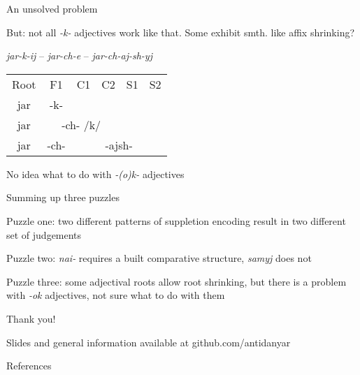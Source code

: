 \documentclass[xcolor=table]{beamer}
\begin{document}
	\begin{frame}{An unsolved problem}

		But: not all \textit{-k-} adjectives work like that. Some exhibit smth. like affix shrinking?

		\textit{jar-k-ij} -- \textit{jar-ch-e} -- \textit{jar-ch-aj-sh-yj}

		\begin{table}[]
\centering
\begin{tabular}{cccccc}

Root                        & F1                          & C1 & C2 & S1 & S2 \\ 
\cellcolor[HTML]{67FD9A}jar & \cellcolor[HTML]{FFCCC9}-k- &    &    &    &    \\
\cellcolor[HTML]{67FD9A}jar &
  \multicolumn{3}{c}{\cellcolor[HTML]{FFCCC9}-ch- /k/} &
  \multicolumn{2}{c}{\cellcolor[HTML]{FFFFFF}} \\
\cellcolor[HTML]{67FD9A}jar &
  \cellcolor[HTML]{FFCCC9}-ch- &
  \multicolumn{4}{c}{\cellcolor[HTML]{CBCEFB}-ajsh-}  \\ 
\end{tabular}
\end{table}

	No idea what to do with \textit{-(o)k-} adjectives

	\end{frame}

	\begin{frame}{Summing up three puzzles}

		Puzzle one: two different patterns of suppletion encoding result in two different set of judgements

		Puzzle two: \textit{nai-} requires a built comparative structure, \textit{samyj} does not
	
		Puzzle three: some adjectival roots allow root shrinking, but there is a problem with \textit{-ok} adjectives, not sure what to do with them

	\end{frame}

	\begin{frame}

		Thank you!

		Slides and general information available at github.com/antidanyar

	\end{frame}

	\begin{frame}[allowframebreaks]{References}

		\printbibliography		

	\end{frame}
\end{document}
